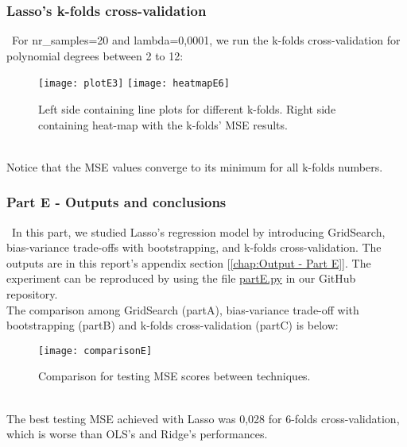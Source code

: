 \subsubsection{Lasso's k-folds cross-validation}
\label{chap:Lasso's k-folds cross-validation}

\quad \, For nr\_samples=20 and lambda=0,0001, we run the k-folds cross-validation for polynomial degrees between 2 to 12:

\begin{figure}[H]
\label{fig:plotE3andh6}
\centering
\texttt{[image: plotE3]}
\texttt{[image: heatmapE6]}
\caption{Left side containing line plots for different k-folds. Right side containing heat-map with the k-folds' MSE results.}
\end{figure}\\

Notice that the MSE values converge to its minimum for all k-folds numbers.\\

\subsubsection{Part E - Outputs and conclusions}
\label{chap:Part E - Outputs and conclusions}

\quad \, In this part, we studied Lasso's regression model by introducing GridSearch, bias-variance trade-offs with bootstrapping, and k-folds cross-validation. The outputs are in this report's appendix section [\ref{chap:Output - Part E}]. The experiment can be reproduced by using the file \href{https://github.com/fabiorodp/UiO-FYS-STK4155/blob/master/Project1/partE.py}{partE.py} in our GitHub repository.\\ 

The comparison among GridSearch (partA), bias-variance trade-off with bootstrapping (partB) and k-folds cross-validation (partC) is below:\\

\begin{figure}[H]
\label{fig:comparisonE}
\centering
\texttt{[image: comparisonE]}
\caption{Comparison for testing MSE scores between techniques.}
\end{figure}\\

The best testing MSE achieved with Lasso was 0,028 for 6-folds cross-validation, which is worse than OLS's and Ridge's performances.\\

